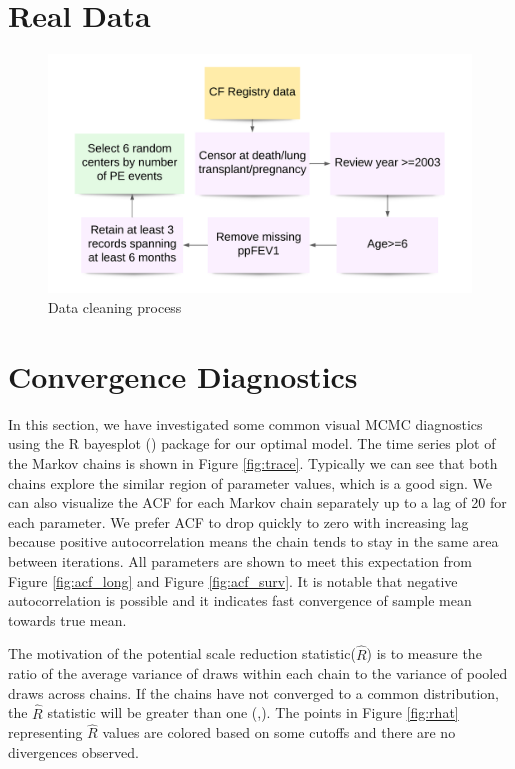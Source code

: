 \section{Real Data}

\begin{figure}[H]
\centering
\includegraphics[width=\textwidth]{Figures/Chp3_data_diag.png}
\caption{Data cleaning process}
\end{figure}

\section{Convergence Diagnostics}

In this section, we have investigated some common visual MCMC diagnostics using the R bayesplot (\cite{bayesplot2020}) package for our optimal model. The time series plot of the Markov chains is shown in Figure \ref{fig:trace}. Typically we can see that both chains explore the similar region of parameter values, which is a good sign. We can also visualize the ACF for each Markov chain separately up to a lag of 20 for each parameter. We prefer ACF to drop quickly to zero with increasing lag because positive autocorrelation means the chain tends to stay in the same area between iterations. All parameters are shown to meet this expectation from Figure \ref{fig:acf_long} and Figure \ref{fig:acf_surv}. It is notable that negative autocorrelation is possible and it indicates fast convergence of sample mean towards true mean.  

The motivation of the potential scale reduction statistic($\hat{R}$) is to measure the ratio of the average variance of draws within each chain to the variance of pooled draws across chains. If the chains have not converged to a common distribution, the $\hat{R}$ statistic will be greater than one (\cite{Gelman2013b},\cite{Rstan2020}). The points in Figure \ref{fig:rhat} representing $\hat{R}$ values are colored based on some cutoffs and there are no divergences observed.   

